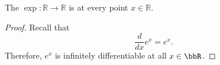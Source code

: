 \begin{corollary} \label{corollary:real_exponential_function_is_infinitely_differentiable}
    The  $\exp : \mathbb{R} \to \mathbb{R}$ is  at every point $x \in \mathbb{R}$.
\end{corollary}
\begin{proof}
    Recall that 
    $$\frac{d}{dx} e^x = e^x.$$
     Therefore, $e^x$ is infinitely differentiable at all $x \in \bbR$.
\end{proof}